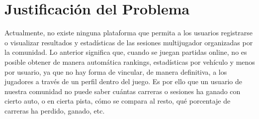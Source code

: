 \section{Justificación del Problema}
Actualmente, no existe ninguna plataforma que permita a los usuarios registrarse o visualizar resultados y estadísticas de las sesiones multijugador organizadas por la comunidad. Lo anterior significa que, cuando se juegan partidas online, no es posible obtener de manera automática rankings, estadísticas por vehículo y menos por usuario, ya que no hay forma de vincular, de manera definitiva, a los jugadores a través de un perfil dentro del juego. Es por ello que un usuario de nuestra comunidad no puede saber cuántas carreras o sesiones ha ganado con cierto auto, o en cierta pista, cómo se compara al resto, qué porcentaje de carreras ha perdido, ganado, etc.




